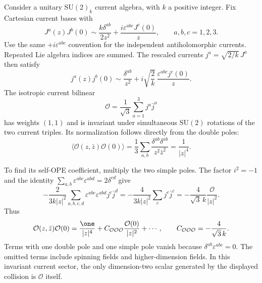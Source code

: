 \begin{example}
\label{ex:full-nonabelian-running}
Consider a unitary $\mathrm{SU}(2)_k$ current algebra, with
$k$ a positive integer. Fix Cartesian current bases with
\[
 J^a(z)J^b(0)\sim\frac{k\delta^{ab}}{2z^2}
             +\frac{i\varepsilon^{abc}J^c(0)}{z},
 \qquad a,b,c=1,2,3.
\]
Use the same $+i\varepsilon^{abc}$ convention for the independent
antiholomorphic currents. Repeated Lie algebra indices are summed.
The rescaled currents $j^a=\sqrt{2/k}\,J^a$ then satisfy
\[
 j^a(z)j^b(0)\sim\frac{\delta^{ab}}{z^2}
       +i\sqrt{\frac2k}\,
                      \frac{\varepsilon^{abc}j^c(0)}{z}.
\]
The isotropic current bilinear
\[
 \mathcal O=\frac1{\sqrt3}\sum_{a=1}^3j^a\bar j^a
\]
has weights $(1,1)$ and is invariant under simultaneous
$\mathrm{SU}(2)$ rotations of the two current triples.
Its normalization follows directly from the double poles:
\[
 \langle\mathcal O(z,\bar z)\mathcal O(0)\rangle
 =\frac1{3}\sum_{a,b}
           \frac{\delta^{ab}\delta^{ab}}{z^2\bar z^2}
 =\frac1{|z|^4}.
\]

To find its self-OPE coefficient, multiply the two simple poles.
The factor $i^2=-1$ and the identity
$\sum_{a,b}\varepsilon^{abc}\varepsilon^{abd}
=2\delta^{cd}$ give
\[
 -\frac{2}{3k|z|^2}
       \sum_{a,b,c,d}\varepsilon^{abc}\varepsilon^{abd}
                  j^c\bar j^d
 =-\frac{4}{3k|z|^2}\sum_cj^c\bar j^c
 =-\frac{4}{\sqrt3\,k}\frac{\mathcal O}{|z|^2}.
\]
Thus
\begin{equation}
 \mathcal O(z,\bar z)\mathcal O(0)
 =\frac{\one}{|z|^4}
  +C_{\mathcal O\mathcal O\mathcal O}
                          \frac{\mathcal O(0)}{|z|^2}
  +\cdots,
 \qquad
 C_{\mathcal O\mathcal O\mathcal O}
       =-\frac4{\sqrt3\,k}.
 \label{eq:full-isotropic-OPE}
\end{equation}
Terms with one double pole and one simple pole vanish because
$\delta^{ab}\varepsilon^{abc}=0$. The omitted terms include
spinning fields and higher-dimension fields. In this invariant
current sector, the only dimension-two scalar generated by the
displayed collision is $\mathcal O$ itself.


\end{example}
